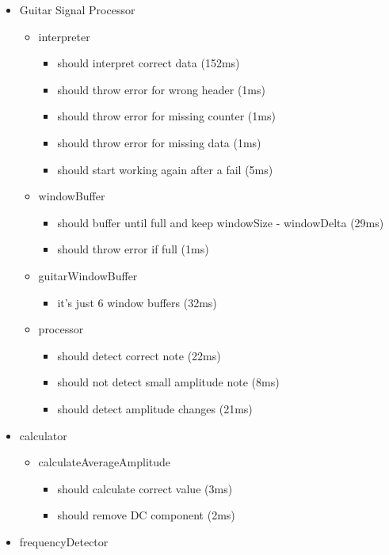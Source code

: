 \begin{annexesenv}
\begin{itemize}
	\item Guitar Signal Processor
	\begin{itemize}
		\item interpreter
		\begin{itemize}
      \item should interpret correct data (152ms)
      \item should throw error for wrong header (1ms)
      \item should throw error for missing counter (1ms)
      \item should throw error for missing data (1ms)
			\item should start working again after a fail (5ms)
	  \end{itemize}
	  \item windowBuffer
	  \begin{itemize}
      \item should buffer until full and keep windowSize - windowDelta (29ms)
		  \item should throw error if full (1ms)
		\end{itemize}
		\item guitarWindowBuffer
		\begin{itemize}
		  \item it's just 6 window buffers (32ms)
		\end{itemize}
		\item processor
		\begin{itemize}
      \item should detect correct note (22ms)
      \item should not detect small amplitude note (8ms)
      \item should detect amplitude changes (21ms)
		\end{itemize}
	\end{itemize}
	\item calculator
	\begin{itemize}
		\item calculateAverageAmplitude
		\begin{itemize}
			\item should calculate correct value (3ms)
			\item should remove DC component (2ms)
		\end{itemize}
	\end{itemize}
	\item frequencyDetector
	\begin{itemize}

\end{itemize}
\end{itemize}
\end{annexesenv}
